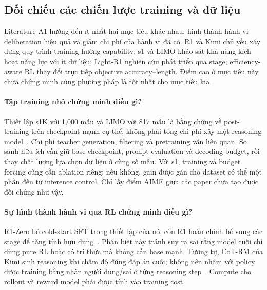 \subsection{Đối chiếu các chiến lược training và dữ liệu}
\label{subsec:a1_comparison}

Literature A1 hướng đến ít nhất hai mục tiêu khác nhau: hình thành hành vi deliberation hiệu quả và giảm chi phí của hành vi đã có. R1 và Kimi chủ yếu xây dựng quy trình training hướng capability; s1 và LIMO khảo sát khả năng kích hoạt năng lực với ít dữ liệu; Light-R1 nghiên cứu phát triển qua stage; efficiency-aware RL thay đổi trực tiếp objective accuracy--length. Điểm cao ở mục tiêu này chưa chứng minh cùng phương pháp là tốt nhất cho mục tiêu kia.

\paragraph{Tập training nhỏ chứng minh điều gì?}
Thiết lập s1K với 1,000 mẫu và LIMO với 817 mẫu là bằng chứng về post-training trên checkpoint mạnh cụ thể, không phải tổng chi phí xây một reasoning model~\cite{rra1_s1,rra1_limo}. Chi phí teacher generation, filtering và pretraining vẫn liên quan. So sánh hữu ích cần giữ base checkpoint, prompt evaluation và decoding budget, rồi thay chất lượng lựa chọn dữ liệu ở cùng số mẫu. Với s1, training và budget forcing cũng cần ablation riêng; nếu không, gain được gán cho dataset có thể một phần đến từ inference control. Chỉ lấy điểm AIME giữa các paper chưa tạo được đối chứng như vậy.

\paragraph{Sự hình thành hành vi qua RL chứng minh điều gì?}
R1-Zero bỏ cold-start SFT trong thiết lập của nó, còn R1 hoàn chỉnh bổ sung các stage để tăng tính hữu dụng~\cite{rra1_deepseek_r1}. Phân biệt này tránh suy ra sai rằng model cuối chỉ dùng pure RL hoặc có tri thức mà không cần base mạnh. Tương tự, CoT-RM của Kimi sinh reasoning khi chấm độ đúng đáp án cuối; không nên nhầm với policy được training bằng nhãn người đúng/sai ở từng reasoning step~\cite{rra1_kimi_k15}. Compute cho rollout và reward model phải được tính vào training cost.

